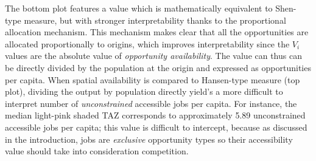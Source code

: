 \documentclass[10pt,letterpaper]{article}
\begin{document}
The bottom plot features a value which is mathematically equivalent to
Shen-type measure, but with stronger interpretability thanks to the
proportional allocation mechanism. This mechanism makes clear that all
the opportunities are allocated proportionally to origins, which
improves interpretability since the \(V_i\) values are the absolute
value of \emph{opportunity availability}. The value can thus can be
directly divided by the population at the origin and expressed as
opportunities per capita. When spatial availability is compared to
Hansen-type measure (top plot), dividing the output by population
directly yield's a more difficult to interpret number of
\emph{unconstrained} accessible jobs per capita. For instance, the
median light-pink shaded TAZ corresponds to approximately 5.89
unconstrained accessible jobs per capita; this value is difficult to
intercept, because as discussed in the introduction, jobs are
\emph{exclusive} opportunity types so their accessibility value should
take into consideration competition.
\end{document}
